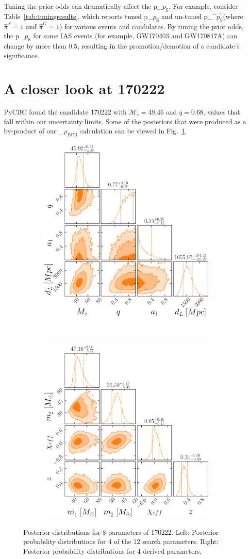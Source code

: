 \documentclass[%
 nofootinbib,
 amsmath,amssymb,
 aps,
 twocolumn,
 superscriptaddress
]{revtex4-2}
\newcommand{\fancytext}[1]{{\relax\ifmmode#1\else $#1$\fi}\xspace}
\newcommand{\mathcmd}[1]{{\sc \relax\ifmmode#1\else $#1$\fi}\xspace}
\newcommand{\bcr}{\mathcmd{\rho_\text{BCR}}}
\newcommand{\pastrobcr}{\fancytext{p_\text{S}}}
\newcommand{\untunedpastrobcr}{\fancytext{p_\text{S}^{\prime}}}
\begin{document}
Tuning the prior odds can dramatically affect the \pastrobcr. For example, consider Table~\ref{tab:tuningresults}, which reports tuned \pastrobcr and un-tuned \untunedpastrobcr (where $\hat{\pi}^S=1$ and $\hat{\pi}^G=1$) for various events and candidates. By tuning the prior odds, the \pastrobcr for some IAS events (for example, GW170403 and GW170817A) can change by more than 0.5, resulting in the promotion/demotion of a candidate's significance.





\section{A closer look at 170222}\label{apdx:170222}
PyCBC found the candidate 170222 with $\mathcal{M}_c=49.46$ and $q=0.68$, values that fall within our uncertainty limits. Some of the posteriors that were produced as a by-product of our \bcr calculation can be viewed in Fig.~\ref{fig:170222}.

\begin{figure}
    \centering
    \begin{subfigure}
        \centering
        \includegraphics[width=0.45\linewidth]{170222_prior_posterior.png}
    \end{subfigure}
    ~ 
    \begin{subfigure}
        \centering
        \includegraphics[width=0.45\linewidth]{170222_source_posterior.png}
    \end{subfigure}
    \caption{Posterior distributions for 8 parameters of 170222. 
    Left: Posterior probability distributions for 4 of the 12 search parameters.
    Right: Posterior probability distributions for 4 derived parameters.
    \label{fig:170222}}
\end{figure}





\end{document}
